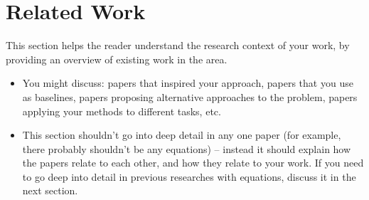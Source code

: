 \section{Related Work}
This section helps the reader understand the research context of your work, by providing an overview of existing work in the area.
\begin{itemize}
    \item You might discuss: papers that inspired your approach, papers that you use as baselines, papers proposing alternative approaches to the problem, papers applying your methods to different tasks, etc.
    \item This section shouldn't go into deep detail in any one paper (for example, there probably shouldn't be any equations) – instead it should explain how the papers relate to each other, and how they relate to your work. If you need to go deep into detail in previous researches with equations, discuss it in the next section.
\end{itemize}
\cite{thakur2025hard}